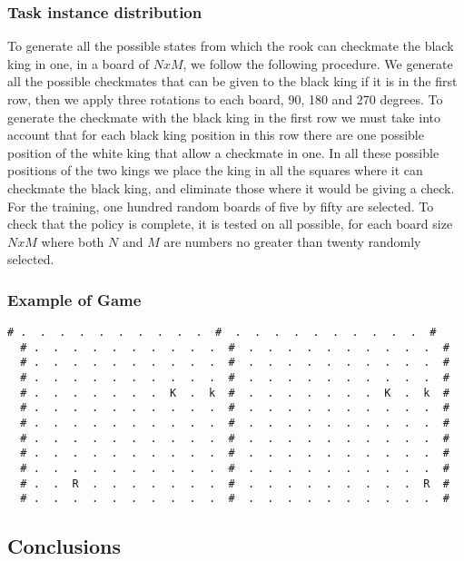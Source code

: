 \documentclass[a4paper]{article}
\begin{document}
\subsubsection{Task instance distribution}
To generate all the possible states from which the rook can checkmate the black king in one, in a board of $NxM$, we follow the following procedure. We generate all the possible checkmates that can be given to the black king if it is in the first row, then we apply three rotations to each board, 90, 180 and 270 degrees. To generate the checkmate with the black king in the first row we must take into account that for each black king position in this row there are one possible position of the white king that allow a checkmate in one. In all these possible positions of the two kings we place the king in all the squares where it can checkmate the black king, and eliminate those where it would be giving a check. For the training, one hundred random boards of five by fifty are selected. To check that the policy is complete, it is tested on all possible, for each board size $NxM$ where both $N$ and $M$ are numbers no greater than twenty randomly selected.


\subsubsection{Example of Game}
\begin{Verbatim}[fontsize=\footnotesize]
  # .  .  .  .  .  .  .  .  .  .  #  .  .  .  .  .  .  .  .  .  .  #
  # .  .  .  .  .  .  .  .  .  .  #  .  .  .  .  .  .  .  .  .  .  #
  # .  .  .  .  .  .  .  .  .  .  #  .  .  .  .  .  .  .  .  .  .  #
  # .  .  .  .  .  .  .  .  .  .  #  .  .  .  .  .  .  .  .  .  .  #
  # .  .  .  .  .  .  .  K  .  k  #  .  .  .  .  .  .  .  K  .  k  #
  # .  .  .  .  .  .  .  .  .  .  #  .  .  .  .  .  .  .  .  .  .  #
  # .  .  .  .  .  .  .  .  .  .  #  .  .  .  .  .  .  .  .  .  .  #
  # .  .  .  .  .  .  .  .  .  .  #  .  .  .  .  .  .  .  .  .  .  #
  # .  .  .  .  .  .  .  .  .  .  #  .  .  .  .  .  .  .  .  .  .  #
  # .  .  .  .  .  .  .  .  .  .  #  .  .  .  .  .  .  .  .  .  .  #
  # .  .  R  .  .  .  .  .  .  .  #  .  .  .  .  .  .  .  .  .  R  #
  # .  .  .  .  .  .  .  .  .  .  #  .  .  .  .  .  .  .  .  .  .  #
\end{Verbatim}

\newpage

\subsection{Conclusions}
\end{document}
